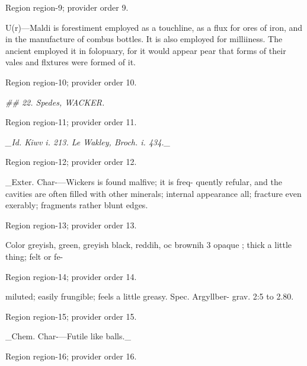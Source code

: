 \documentclass[11pt]{article}
\begin{document}
{\scriptsize\color{gray} Region region-9; provider order 9.\par}
\medskip

U(r)—Maldi is forestiment employed as a touchline,
as a flux for ores of iron, and in the manufacture of
combus bottles. It is also employed for milliiness.
The ancient employed it in folopuary, for it would appear
pear that forms of their vales and flxtures were formed
of it.
\par

{\scriptsize\color{gray} Region region-10; provider order 10.\par}
\medskip

{\small\itshape \#\# 22. Spedes, WACKER.\par}

{\scriptsize\color{gray} Region region-11; provider order 11.\par}
\medskip

{\small\itshape \_Id. Kiwv i. 213. Le Wakley, Broch. i. 434.\_\par}

{\scriptsize\color{gray} Region region-12; provider order 12.\par}
\medskip

\_Exter. Char-—Wickers is found malfive; it is freq-
quently refular, and the cavities are often filled with
other minerals; internal appearance all; fracture even
exerably; fragments rather blunt edges.
\par

{\scriptsize\color{gray} Region region-13; provider order 13.\par}
\medskip

Color greyish, green, greyish black, reddih, oc
brownih 3 opaque ; thick a little thing; felt or fe-
\par

{\scriptsize\color{gray} Region region-14; provider order 14.\par}
\medskip

miluted; easily frungible; feels a little greasy. Spec. Argyllber-
grav. 2:5 to 2.80.
\par

{\scriptsize\color{gray} Region region-15; provider order 15.\par}
\medskip

\_Chem. Char-—Futile like balls.\_
\par

{\scriptsize\color{gray} Region region-16; provider order 16.\par}
\medskip
\end{document}
